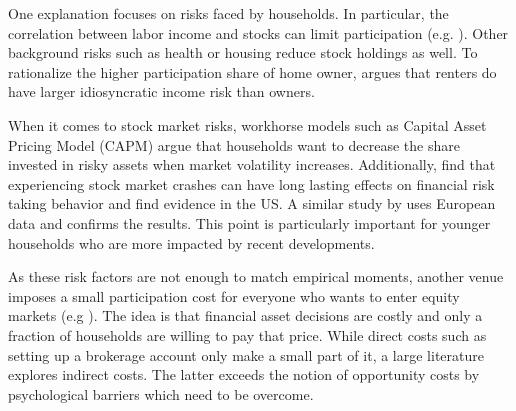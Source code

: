 \documentclass[ProjectABM]{subfiles}
\begin{document}
One explanation focuses on risks faced by households. In particular, the correlation between labor income and stocks can limit participation (e.g. \cite{BCG2007stocklabor}). Other background risks such as health \citep{GJT1996_health} or housing \citep{cocco2005housing} reduce stock holdings as well. To rationalize the higher participation share of home owner, \cite{catherine2020_countercyclical} argues that renters do have larger idiosyncratic income risk than owners.%

When it comes to stock market risks, workhorse models such as Capital Asset Pricing Model (CAPM) argue that households want to decrease the share invested in risky assets when market volatility increases. Additionally, \cite{malmendier_2011} find that experiencing stock market crashes can have long lasting effects on financial risk taking behavior and find evidence in the US. A similar study by \cite{ampudia_ehrmann_2017macroeconomic} uses European data and confirms the results. This point is particularly important for younger households who are more impacted by recent developments.

As these risk factors are not enough to match empirical moments, another venue imposes a small participation cost for everyone who wants to enter equity markets (e.g \cite{vissing_2003, HM2003portfolio, GM2005portfolio}). The idea is that financial asset decisions are costly and only a fraction of households are willing to pay that price. While direct costs such as setting up a brokerage account only make a small part of it, a large literature explores indirect costs.  The latter exceeds the notion of opportunity costs by psychological barriers which need to be overcome. %
\end{document}
